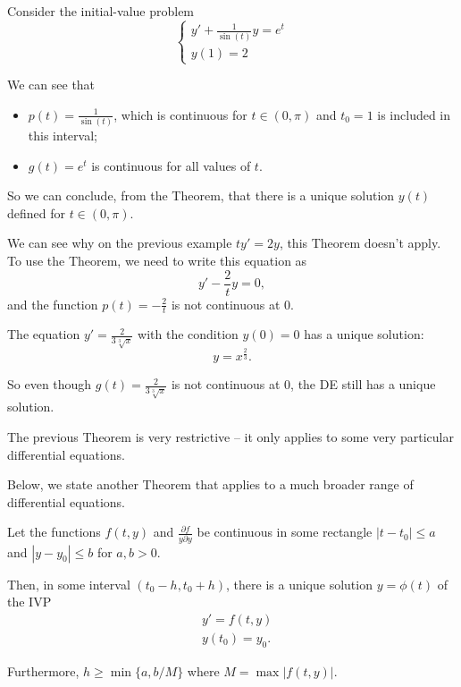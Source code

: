 \begin{example}
Consider the initial-value problem
$$
\begin{cases}
y'+\frac{1}{\sin(t)}y = e^t \\
y(1)=2
\end{cases}
$$

We can see that 
\begin{itemize}
	\item $p(t) = \frac{1}{\sin(t)}$, which is continuous for $t \in (0,\pi)$ and $t_0=1$ is included in this interval;
	\item $g(t) = e^t$ is continuous for all values of $t$.
\end{itemize}

So we can conclude, from the Theorem, that there is a unique solution $y(t)$ defined for $t \in (0,\pi)$.
\end{example}


\begin{example}
We can see why on the previous example $ty'=2y$, this Theorem doesn't apply. To use the Theorem, we need to write this equation as 
$$
y' -\frac2t y = 0,
$$
and the function $p(t) = -\frac2t$ is not continuous at $0$.
\end{example}


\begin{example} The equation $y'=\frac{2}{3\sqrt[3]{x}}$ with the condition $y(0) = 0$ has a unique solution:
$$
y = x^{\frac23}.
$$

So even though $g(t) = \frac{2}{3\sqrt[3]{x}}$ is not continuous at $0$, the DE still has a unique solution.
\end{example}





The previous Theorem is very restrictive -- it only applies to some very particular differential equations. 

Below, we state another Theorem that applies to a much broader range of differential equations.

\begin{theorem}
Let the functions $f(t,y)$ and $\frac{\partial f}{y\partial y}$ be continuous in some rectangle $|t-t_0|\leq a$ and $|y-y_0|\leq b$ for $a,b>0$.

Then, in some interval $(t_0-h,t_0+h)$, there is a unique solution $y=\phi(t)$ of the IVP
\begin{align*}
& y' = f(t,y) \\
& y(t_0) = y_0.
\end{align*}

Furthermore, $h \geq \min\{ a,b/M\}$ where $M = \max \big| f(t,y) \big|$.
\end{theorem}

